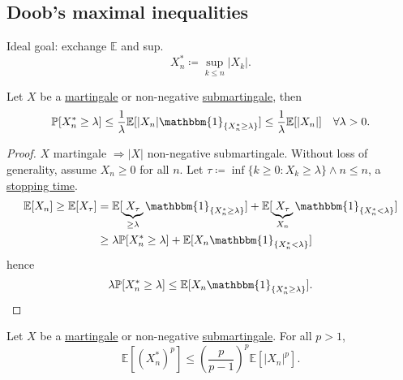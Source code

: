 \documentclass{article}
\newcommand{\1}[1]{\mathbbm{1}_{#1}}
\newcommand{\Prob}{\mathbb{P}}
\newcommand{\E}{\mathbb{E}}
\begin{document}
\subsection{Doob's maximal inequalities}
Ideal goal: exchange $\E$ and sup.
\begin{equation*}
  X_n^* \coloneqq \sup_{k \leq n} |X_k|
.\end{equation*}
\begin{nthm}\label{thm:2.10}
  Let $X$ be a \hyperlink{def:martingale}{martingale} or non-negative \hyperlink{def:martingale}{submartingale}, then
  \begin{equation*}
    \Prob[X_n^* \geq \lambda] \leq \frac{1}{\lambda} \E[|X_n| \1{\{X_n^* \geq \lambda\}}] \leq \frac{1}{\lambda } \E[|X_n|] \quad \forall \lambda > 0
  .\end{equation*}
\end{nthm}
\begin{proof}
  $X$ martingale $\Rightarrow |X|$ non-negative submartingale. Without loss of generality, assume $X_n \geq 0$ for all $n$.
  Let $\tau \coloneqq \inf\{k \geq 0 : X_k \geq \lambda\} \land n \leq n$, a \hyperlink{def:stopping}{stopping time}.
  \begin{align*}
    \E[X_n] \geq \E[X_\tau] &= \E[\underbrace{X_\tau}_{\geq \lambda} \1{\{X_n^* \geq \lambda\}}] + \E[\underbrace{X_\tau}_{X_n} \1{\{X_n^* < \lambda\}}] \\
    &\geq \lambda \Prob[X_n^* \geq \lambda] + \E[X_n \1{\{X_n^* < \lambda\}}]
  \end{align*}
  hence
  \begin{equation*}
    \lambda \Prob[X_n^* \geq \lambda] \leq \E[X_n \1{\{X_n^* \geq \lambda\}}]
  .\qedhere\end{equation*}
\end{proof}
\begin{nthm}\label{thm:2.11}
  Let $X$ be a \hyperlink{def:martingale}{martingale} or non-negative \hyperlink{def:martingale}{submartingale}. For all $p > 1$,
  \begin{equation*}
    \E[(X_n^*)^p] \leq (\frac{p}{p-1})^p \E[|X_n|^p]
  .\end{equation*}
\end{nthm}
\end{document}
